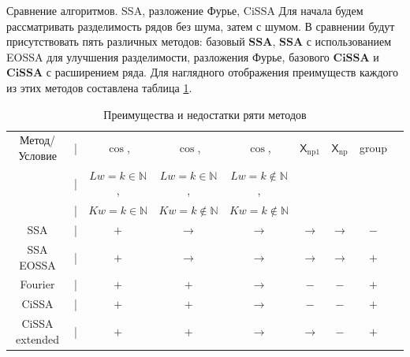 \documentclass[notheorems, handout]{beamer}
\newcommand{\SSA}{\textbf{SSA}}
\newcommand{\CISSA}{\textbf{CiSSA}}
\newcommand{\TS}{\mathsf{X}}
\begin{document}
	\begin{frame}{Сравнение алгоритмов. SSA, разложение Фурье, CiSSA }
		Для начала будем рассматривать разделимость рядов без шума, затем с шумом.
		В сравнении будут присутствовать пять различных методов: базовый $\SSA$,  $\SSA$ с использованием EOSSA для улучшения разделимости, разложения Фурье, базового $\CISSA$ и $\CISSA$ с расширением ряда. Для наглядного отображения преимуществ каждого из этих методов составлена таблица \ref{tab:advantages}.
		\begin{table}[H]
			\centering
			\tiny
			\begin{center}
				\begin{tabular}{ccccccccc}
					\hline
					Метод/Условие  &|& $\cos$,                 & $\cos$,                    & $\cos$,                     & $\TS_{\mathrm{np1}}$   & $\TS_{\mathrm{np}}$ & group\\ 
					&|& $Lw = k \in \mathbb N$, & $Lw = k \in \mathbb N$,    & $Lw = k \not\in \mathbb N$, &             \\
					&|& $Kw = k \in \mathbb N$  & $Kw = k \not\in \mathbb N$ & $Kw = k \not\in \mathbb N$  &             \\ 
					\hline
					SSA            &|& $+$                     & $\to$                      & $\to$                       & $\to$ & $\to$ & $-$ \\
					SSA EOSSA      &|& $+$                     & $\to$                      & $\to$                       & $\to$ & $\to$ & $+$ \\
					Fourier        &|& $+$                     & $+$                        & $\to$                       & $-$   & $-$ & $+$ \\
					CiSSA          &|& $+$                     & $+$                        & $\to$                       & $-$   & $-$ & $+$ \\
					CiSSA extended &|& $+$                     & $+$                        & $\to$                       & $\to$ & $-$ & $+$ \\
					\hline
				\end{tabular}
			\end{center}
			\caption{Преимущества и недостатки ряти методов} 
			\label{tab:advantages}
		\end{table}
		
\end{frame}
\end{document}
